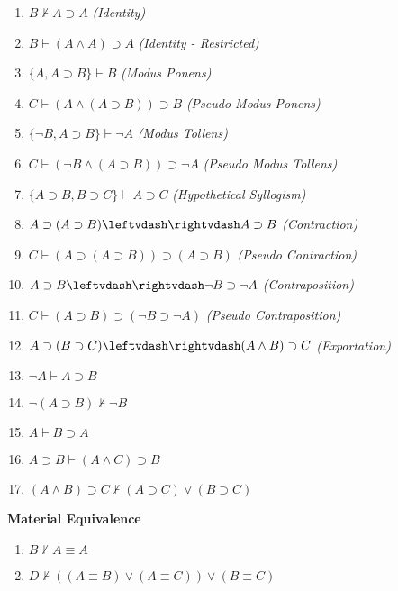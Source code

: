 \begin{singlespace}
\begin{enumerate}
\setcounter{enumi}{\value{enumi_saved}}
\item $ B\nvdash  A \supset  A $\hfill\emph{ (Identity)}  
\item $ B\vdash  (A \wedge  A) \supset  A $\hfill\emph{ (Identity - Restricted)}  
\item $ \{A, A \supset  B \} \vdash  B $\hfill\emph{ (Modus Ponens)}  
\item $ C\vdash  (A \wedge  (A \supset  B)) \supset  B $\hfill\emph{ (Pseudo Modus Ponens)}  
\item $ \{\neg B, A \supset  B \} \vdash  \neg A $\hfill\emph{ (Modus Tollens)}  
\item $ C\vdash  (\neg B \wedge  (A \supset  B)) \supset  \neg A $\hfill\emph{ (Pseudo Modus Tollens)}  
\item $ \{A \supset  B, B \supset  C \} \vdash  A \supset  C $\hfill\emph{ (Hypothetical Syllogism)}  
\item $ A \supset  (A \supset  B)\leftvdash\rightvdash  A \supset  B $ \hfill\emph{ (Contraction)}  
\item $ C\vdash  (A \supset  (A \supset  B)) \supset  (A \supset  B) $\hfill\emph{ (Pseudo Contraction)}  
\item $ A \supset  B\leftvdash\rightvdash  \neg B \supset  \neg A $ \hfill\emph{ (Contraposition)}  
\item $ C\vdash  (A \supset  B) \supset  (\neg B \supset  \neg A) $\hfill\emph{ (Pseudo Contraposition)}  
\item $ A \supset  (B \supset  C)\leftvdash\rightvdash  (A \wedge  B) \supset  C $ \hfill\emph{ (Exportation)}  
\item $ \neg A\vdash  A \supset  B $\hfill\emph{ }  
\item $ \neg (A \supset  B)\nvdash  \neg B $\hfill\emph{ }  
\item $ A\vdash  B \supset  A $\hfill\emph{ }  
\item $ A \supset  B\vdash  (A \wedge  C) \supset  B $\hfill\emph{ }  
\item $ (A \wedge  B) \supset  C\nvdash  (A \supset  C) \vee  (B \supset  C) $\hfill\emph{ }  
\setcounter{enumi_saved}{\value{enumi}}
\end{enumerate}


\noindent \textbf{Material Equivalence}

\begin{enumerate}
\setcounter{enumi}{\value{enumi_saved}}
\item $ B\nvdash  A \equiv  A $\hfill\emph{ }  
\item $ D\nvdash  ((A \equiv  B) \vee  (A \equiv  C)) \vee  (B \equiv  C) $\hfill\emph{ }  
\setcounter{enumi_saved}{\value{enumi}}
\end{enumerate}


\end{singlespace}
